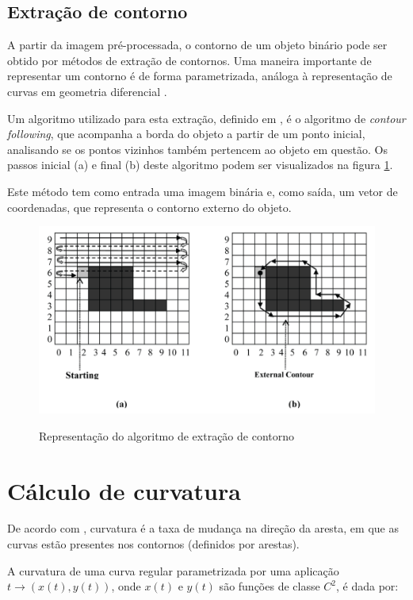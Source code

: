 \documentclass[
	12pt,				%
	oneside,			%
	a4paper,			%
	sumario=tradicional,
	english,			%
	french,				%
	spanish,			%
	brazil,				%
]{abntex2}
\begin{document}
\subsection{Extração de contorno}

A partir da imagem pré-processada, o contorno de um objeto binário pode ser obtido por métodos de extração de contornos. Uma maneira importante de representar um contorno é de forma parametrizada, análoga à representação de curvas em geometria diferencial \cite{szeliski}.

Um algoritmo utilizado para esta extração, definido em , é o algoritmo de \textit{contour following}, que acompanha a borda do objeto a partir de um ponto inicial, analisando se os pontos vizinhos também pertencem ao objeto em questão. Os passos inicial (a) e final (b) deste algoritmo podem ser visualizados na figura \ref{fig:contorno}.

Este método tem como entrada uma imagem binária e, como saída, um vetor de coordenadas, que representa o contorno externo do objeto.

\begin{figure}[htb]
\centering
    \caption{Representação do algoritmo de extração de contorno}
    \includegraphics[width=.7\linewidth]{./img/contorno.png}
    \label{fig:contorno}
\end{figure}

\section{Cálculo de curvatura}

De acordo com , curvatura é a taxa de mudança na direção da aresta, em que as curvas estão presentes nos contornos (definidos por arestas).

A curvatura de uma curva regular parametrizada por uma aplicação $t \rightarrow (x(t), y(t))$, onde $x(t)$ e $y(t)$ são funções de classe $C^2$, é dada por:
\end{document}
